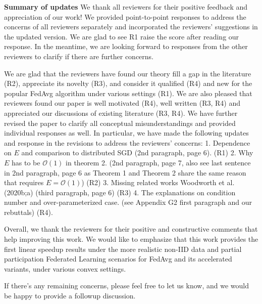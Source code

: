 \documentclass{article}
\begin{document}
\textbf{Summary of updates}
We thank all reviewers for their positive feedback and appreciation of our work! 
We provided point-to-point responses to address the concerns of all reviewers separately and
incorporated the reviewers' suggestions in the updated version. We are glad to see R1 raise 
the score after reading our response. In the meantime, we are looking forward to 
responses from the other reviewers to clarify if there are further concerns.

We are glad that the reviewers have found our theory fill a gap in the literature (R2), 
appreciate its novelty (R3), and consider it qualified (R4) and new for the popular FedAvg algorithm under various settings (R1). We are also pleased that reviewers found our paper is well motivated (R4), well written (R3, R4) and appreciated our discussions of existing literature (R3, R4). We have further revised the paper to clarify all conceptual misunderstandings and provided individual responses as well. In particular, we have made the following updates and response in the revisions to address the reviewers' concerns:
1. Dependence on $E$ and comparison to distributed SGD (2nd paragraph, page 6). (R1)
2. Why $E$ has to be $\mathcal{O}(1)$ in theorem 2. (2nd paragraph, page 7, also see last sentence in 2nd paragraph, page 6 as Theorem 1 and Theorem 2 share the same reason that requires $E=\mathcal{O}(1)$) (R2)
3. Missing related works Woodworth et al. (2020b;a) (third paragraph, page 6) (R3)
4. The explanations on condition number and over-parameterized case. (see Appendix G2 first paragraph and our rebuttals) (R4).

Overall, we thank the reviewers for their positive and constructive comments that help improving this work. We would like to emphasize that this work provides the first linear speedup results under the more realistic non-IID data and partial participation Federated Learning scenarios for FedAvg and its accelerated variants, under various convex settings. 

If there's any remaining concerns, please feel free to let us know, and we would be happy to provide a followup discussion.



    
\end{document}
